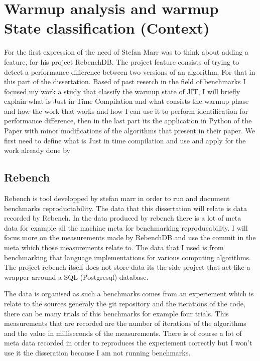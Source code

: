 \documentclass{article}
\begin{document}
\section{Warmup analysis and warmup State classification (Context)}

For the first expression of the need of Stefan Marr was to think about adding a feature, for his project RebenchDB. The project feature consists of trying to detect a performance difference between two versions of an algorithm. For that in this part of the dissertation. Based of past reserch in the field of benchmarks I focused my work a study that classify the warmup state of JIT, I will briefly explain what is Just in Time Compilation and what consists the warmup phase and how the work that \citep{barrett2017virtual} works and how I can use it to perform identification for performance difference, then in the last part its the application in Python of the Paper with minor modifications of the algorithms that \citep{barrett2017virtual} present in their paper. We first need to define what is Just in time compilation and use and apply for the work already done by \citep{barrett2017virtual}

\subsection{Rebench}

Rebench is tool developped by stefan marr in order to run and document benchmarks reproductability. The data that this dissertation will relate is data recorded by Rebench. In the data produced by rebench there is a lot of meta data for example all the machine meta for benchmarking reproducability. I will focus more on the measurements made by RebenchDB and use the commit in the meta which those measurements relate to. The data that I used is from benchmarking that language implementations for various computing algorithms. The project rebench itself does not store data its the side project that act like a wrapper arround a SQL (Postgresql) database.

The data is organised as such a benchmarks comes from an experiement which is relate to the sources generaly the git repository and the iterations of the code, there can be many trials of this benchmarks for example four trials. This measurements that are recorded are the number of iterations of the algorithms and the value in milliseconds of the measurements. There is of course a lot of meta data recorded in order to reproduces the experiement correctly but I won't use it the disseration because I am not running benchmarks.
\end{document}
